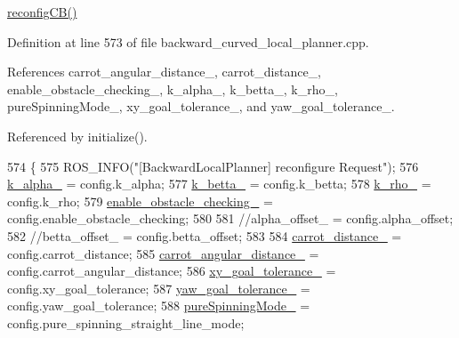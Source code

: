 \hyperlink{classcl__move__base__z_1_1backward__local__planner_1_1BackwardLocalPlanner_a62e4783adae03ce92190d855a021b91d}{reconfig\+C\+B()} 

Definition at line 573 of file backward\+\_\+curved\+\_\+local\+\_\+planner.\+cpp.



References carrot\+\_\+angular\+\_\+distance\+\_\+, carrot\+\_\+distance\+\_\+, enable\+\_\+obstacle\+\_\+checking\+\_\+, k\+\_\+alpha\+\_\+, k\+\_\+betta\+\_\+, k\+\_\+rho\+\_\+, pure\+Spinning\+Mode\+\_\+, xy\+\_\+goal\+\_\+tolerance\+\_\+, and yaw\+\_\+goal\+\_\+tolerance\+\_\+.



Referenced by initialize().


\begin{DoxyCode}
574         \{
575             ROS\_INFO(\textcolor{stringliteral}{"[BackwardLocalPlanner] reconfigure Request"});
576             \hyperlink{classcl__move__base__z_1_1backward__local__planner_1_1BackwardLocalPlanner_abf7a5a56de2ee41afba7e63c0628ec35}{k\_alpha\_} = config.k\_alpha;
577             \hyperlink{classcl__move__base__z_1_1backward__local__planner_1_1BackwardLocalPlanner_a9f257183d87f1d732cb7e404f09905ad}{k\_betta\_} = config.k\_betta;
578             \hyperlink{classcl__move__base__z_1_1backward__local__planner_1_1BackwardLocalPlanner_ad8a36184bfb011545c751109e23d3b98}{k\_rho\_} = config.k\_rho;
579             \hyperlink{classcl__move__base__z_1_1backward__local__planner_1_1BackwardLocalPlanner_a154043366660cc02ec758dda32817511}{enable\_obstacle\_checking\_} = config.enable\_obstacle\_checking;
580 
581             \textcolor{comment}{//alpha\_offset\_ = config.alpha\_offset;}
582             \textcolor{comment}{//betta\_offset\_ = config.betta\_offset;}
583 
584             \hyperlink{classcl__move__base__z_1_1backward__local__planner_1_1BackwardLocalPlanner_a0bbb80ce5bae865c4322869422803296}{carrot\_distance\_} = config.carrot\_distance;
585             \hyperlink{classcl__move__base__z_1_1backward__local__planner_1_1BackwardLocalPlanner_a63e30befa09c4a67cf55086923b760c7}{carrot\_angular\_distance\_} = config.carrot\_angular\_distance;
586             \hyperlink{classcl__move__base__z_1_1backward__local__planner_1_1BackwardLocalPlanner_aa4ec2c87947a3c08f8278eff052e7c8c}{xy\_goal\_tolerance\_} = config.xy\_goal\_tolerance;
587             \hyperlink{classcl__move__base__z_1_1backward__local__planner_1_1BackwardLocalPlanner_a9c5104d328041fcde5a3c02664abad48}{yaw\_goal\_tolerance\_} = config.yaw\_goal\_tolerance;
588             \hyperlink{classcl__move__base__z_1_1backward__local__planner_1_1BackwardLocalPlanner_aebc89ccfa79fdf6bd45ba35134bec3fb}{pureSpinningMode\_} = config.pure\_spinning\_straight\_line\_mode;

\end{DoxyCode}
